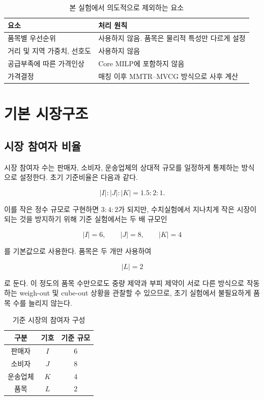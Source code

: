 \documentclass[11pt,a4paper]{article}
\begin{document}
\begin{table}
\centering
\caption{본 실험에서 의도적으로 제외하는 요소}
\begin{tabular}{p{}p{}}
\toprule
\textbf{요소} & \textbf{처리 원칙} \\
\midrule
품목별 우선순위 & 사용하지 않음. 품목은 물리적 특성만 다르게 설정 \\
거리 및 지역 가중치, 선호도 & 사용하지 않음 \\
공급부족에 따른 가격인상 & Core MILP에 포함하지 않음 \\
가격결정 & 매칭 이후 MMTR--MVCG 방식으로 사후 계산 \\
\bottomrule
\end{tabular}
\end{table}

\section{기본 시장구조}

\subsection{시장 참여자 비율}

시장 참여자 수는 판매자, 소비자, 운송업체의 상대적 규모를 일정하게 통제하는 방식으로 설정한다.
초기 기준비율은 다음과 같다.

\[
|I|:|J|:|K| = 1.5:2:1.
\]

이를 작은 정수 규모로 구현하면 $3:4:2$가 되지만,
수치실험에서 지나치게 작은 시장이 되는 것을 방지하기 위해 기준 실험에서는 두 배 규모인

\[
\boxed{|I|=6,\qquad |J|=8,\qquad |K|=4}
\]

를 기본값으로 사용한다.
품목은 두 개만 사용하여

\[
\boxed{|L|=2}
\]

로 둔다.
이 정도의 품목 수만으로도 중량 제약과 부피 제약이 서로 다른 방식으로 작동하는
weigh-out 및 cube-out 상황을 관찰할 수 있으므로,
초기 실험에서 불필요하게 품목 수를 늘리지 않는다.

\begin{table}[h!]
\centering
\caption{기준 시장의 참여자 구성}
\begin{tabular}{ccc}
\toprule
\textbf{구분} & \textbf{기호} & \textbf{기준 규모} \\
\midrule
판매자 & $I$ & 6 \\
소비자 & $J$ & 8 \\
운송업체 & $K$ & 4 \\
품목 & $L$ & 2 \\
\bottomrule
\end{tabular}
\end{table}
\end{document}
